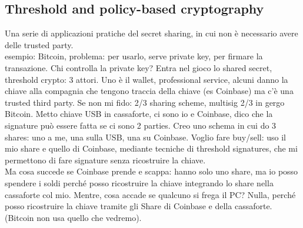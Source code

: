 \documentclass[16px]{article}
\begin{document}
\subsection{Threshold and policy-based cryptography}
Una serie di applicazioni pratiche del secret sharing, in cui non è necessario avere delle trusted party.\\ esempio: Bitcoin, problema: per usarlo, serve private key, per firmare la transazione. Chi controlla la private key? Entra nel gioco lo shared secret, threshold crypto: 3 attori. Uno è il wallet, professional service, alcuni danno la chiave alla compagnia che tengono traccia della chiave (es Coinbase) ma c'è una trusted third party. Se non mi fido: 2/3 sharing scheme, multisig 2/3 in gergo Bitcoin. Metto chiave USB in cassaforte, ci sono io e Coinbase, dico che la signature può essere fatta se ci sono 2 parties. Creo uno schema in cui do 3 shares: uno a me, una sulla USB, una su Coinbase. Voglio fare buy/sell: uso il mio share e quello di Coinbase, mediante tecniche di threshold signatures, che mi permettono di fare signature senza ricostruire la chiave.\\ Ma cosa succede se Coinbase prende e scappa: hanno solo uno share, ma io posso spendere i soldi perché posso ricostruire la chiave integrando lo share nella cassaforte col mio. Mentre, cosa accade se qualcuno si frega il PC? Nulla, perché posso ricostruire la chiave tramite gli Share di Coinbase e della cassaforte. (Bitcoin non usa quello che vedremo).
\end{document}
